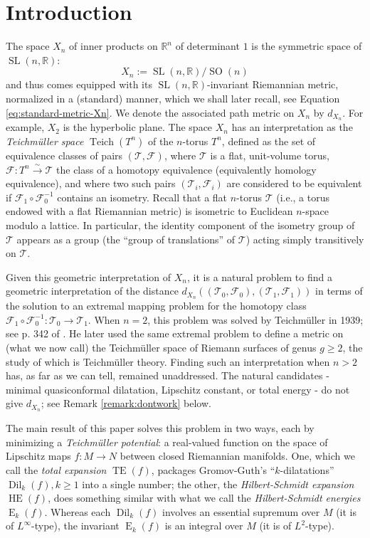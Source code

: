 \documentclass[11pt,letterpaper]{amsart}
\theoremstyle{definition}
\numberwithin{equation}{section}
\theoremstyle{definition}
\newcommand{\Fc}{\mathcal{F}}
\newcommand{\Tc}{\mathcal{T}}
\newcommand{\Rb}{\mathbb{R}}
\DeclareMathOperator{\En}{E}
\DeclareMathOperator{\SL}{SL}
\DeclareMathOperator{\SO}{SO}
\DeclareMathOperator{\Teich}{Teich}
\DeclareMathOperator{\TE}{TE}
\DeclareMathOperator{\HE}{HE}
\newcommand{\Dil}{\operatorname{Dil}}
\begin{document}
\section{Introduction}
The space $X_n$ of inner products on $\Rb^n$ of determinant $1$  is the symmetric space of $\SL(n,\Rb)$:
\[X_n:=\SL(n,\Rb)/\SO(n)\]
and  thus comes equipped with its $\SL(n,\Rb)$-invariant Riemannian metric, normalized in a (standard) manner, which we shall later recall, see Equation \eqref{eq:standard-metric-Xn}.  We  denote the associated path metric on $X_n$ by $d_{X_n}$. For example, $X_2$ is the hyperbolic plane.  The space $X_n$ 
has an interpretation as the {\em Teichm\"uller space} $\Teich(T^n)$ of the $n$-torus $T^n$, defined as the set of equivalence classes of pairs $(\Tc,\Fc)$, 
where $\Tc$ is a flat, unit-volume torus, $\Fc:T^n\xrightarrow{\sim} \Tc$ the class of a  homotopy equivalence (equivalently homology equivalence), and where two such pairs $(\Tc_i,\Fc_i)$ are considered to be equivalent if $\Fc_1\circ \Fc_0^{-1}$ contains an isometry.  Recall that a 
flat $n$-torus $\Tc$ (i.e., a torus endowed  with a flat Riemannian metric) is  isometric to Euclidean $n$-space modulo a lattice. In particular, the  identity component of the isometry group of $\Tc$ 
appears as a group (the ``group of  translations'' of $\Tc$)  acting simply  transitively on $\Tc$.

Given this geometric interpretation of $X_n$, it is a natural problem to find a geometric interpretation 
of the distance $d_{X_n}((\Tc_0,\Fc_0),(\Tc_1,\Fc_1))$ in terms of the solution to an extremal mapping 
problem for the homotopy class $\Fc_1\circ \Fc_0^{-1}:\Tc_0\to \Tc_1$.  When $n=2$, this problem was solved by Teichm\"uller in 1939; see p. 342 of \cite{Teich39}.  He later used the same extremal problem to define a metric on (what we now call) the Teichm\"uller space of Riemann surfaces of genus $g\geq 2$, the study of which is Teichm\"uller theory.  Finding such an interpretation when $n>2$  has, as far as we can tell, remained 
unaddressed.  The natural candidates - minimal quasiconformal dilatation, Lipschitz constant, or total energy - do not give $d_{X_n}$; see Remark 
\ref{remark:dontwork} below.

The main result of this paper solves this problem in two ways, each by minimizing a 
\emph{Teichm\"uller potential}: a real-valued function on the space of Lipschitz maps $f:M\to N$ between closed Riemannian manifolds. One, which we call the {\em total expansion} 
$\TE(f)$,  packages Gromov-Guth's ``$k$-dilatations'' $\Dil_k(f), k\geq 1$ into a single number; 
the other, the \emph{Hilbert-Schmidt expansion} $\HE(f)$,  does something similar  with what we call the \emph{Hilbert-Schmidt energies} $\En_k(f)$. Whereas each $\Dil_k(f)$ involves an essential supremum over $M$ (it is of $L^\infty$-type), the invariant $\En_k(f)$ is an integral over $M$ (it is of $L^2$-type). 
\end{document}
